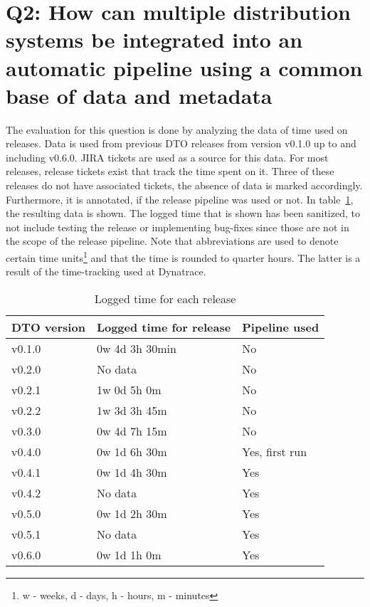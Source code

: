 \section{Q2: How can multiple distribution systems be integrated into an automatic pipeline using a common base of data and metadata}\label{sec:q2:-how-can-multiple-distribution-systems-be-integrated-into-an-automatic-pipeline-using-a-common-base-of-data-and-metadata}

The evaluation for this question is done by analyzing the data of time used on releases.
Data is used from previous DTO releases from version v0.1.0 up to and including v0.6.0.
JIRA tickets are used as a source for this data.
For most releases, release tickets exist that track the time spent on it.
Three of these releases do not have associated tickets, the absence of data is marked accordingly.
Furthermore, it is annotated, if the release pipeline was used or not.
In table\ \ref{tab:logged-time-for-each-release}, the resulting data is shown.
The logged time that is shown has been sanitized, to not include testing the release or implementing bug-fixes since those are not in the scope of the release pipeline.
Note that abbreviations are used to denote certain time units\footnote{w - weeks, d - days, h - hours, m - minutes} and that the time is rounded to quarter hours.
The latter is a result of the time-tracking used at Dynatrace.

\begin{table}[H]
    \centering
    \caption{Logged time for each release}
    \label{tab:logged-time-for-each-release}
    \begin{tabular}{l|l|l}
        DTO version & Logged time for release & Pipeline used \\
        \hline
        v0.1.0 & 0w 4d 3h 30min & No \\
        v0.2.0 & No data & No \\
        v0.2.1 & 1w 0d 5h 0m & No \\
        v0.2.2 & 1w 3d 3h 45m & No \\
        v0.3.0 & 0w 4d 7h 15m & No \\
        v0.4.0 & 0w 1d 6h 30m & Yes, first run \\
        v0.4.1 & 0w 1d 4h 30m & Yes \\
        v0.4.2 & No data & Yes \\
        v0.5.0 & 0w 1d 2h 30m & Yes \\
        v0.5.1 & No data & Yes \\
        v0.6.0 & 0w 1d 1h 0m & Yes \\
    \end{tabular}
\end{table}

